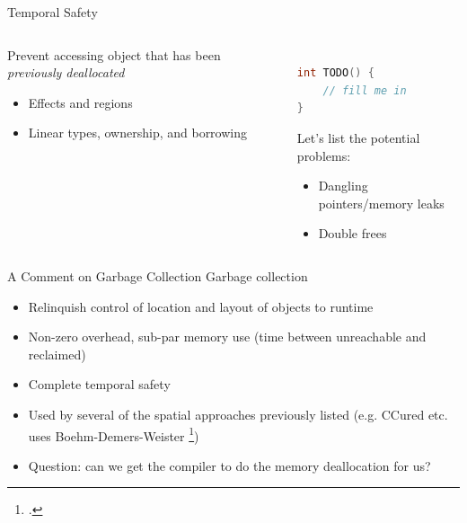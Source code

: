 \documentclass[aspectratio=169]{beamer}
\begin{document}
\begin{frame}[fragile]{Temporal Safety}
  \footnotesize
  \begin{columns}[T]
    \begin{column}{0.45\textwidth}
        Prevent accessing object that has been \emph{previously deallocated}
        \\
        \begin{itemize}
            \item Effects and regions
            \item Linear types, ownership, and borrowing
        \end{itemize}
    \end{column}
    \begin{column}{0.45\textwidth}
\begin{lstlisting}[language=C,mathescape] %,basicstyle={\footnotesize\ttfamily}]

int TODO() {
    // fill me in
}
\end{lstlisting}
Let's list the potential problems:
        \begin{itemize}
            \item Dangling pointers/memory leaks
            \item Double frees
        \end{itemize}
    \end{column}
  \end{columns}
\end{frame}

\begin{frame}{A Comment on Garbage Collection}
Garbage collection
    \begin{itemize}
        \item Relinquish control of location and layout of objects to runtime
        \item Non-zero overhead, sub-par memory use (time between unreachable and reclaimed)
        \item Complete temporal safety
        \item Used by several of the spatial approaches previously listed (e.g. CCured etc. uses Boehm-Demers-Weister \footcite{boehm_garbage_1988})
        \item Question: can we get the compiler to do the memory deallocation for us? %
    \end{itemize}
\end{frame}
\end{document}

